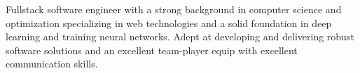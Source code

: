 \vspace{1mm}
\begin{flushleft}
	\begin{cvparagraph}
		Fullstack software engineer  with a strong background in computer science and optimization specializing in web technologies and a solid foundation in deep learning and training neural networks. Adept at developing and delivering robust software solutions and an excellent team-player equip with excellent communication skills.
	\end{cvparagraph}
\end{flushleft}
